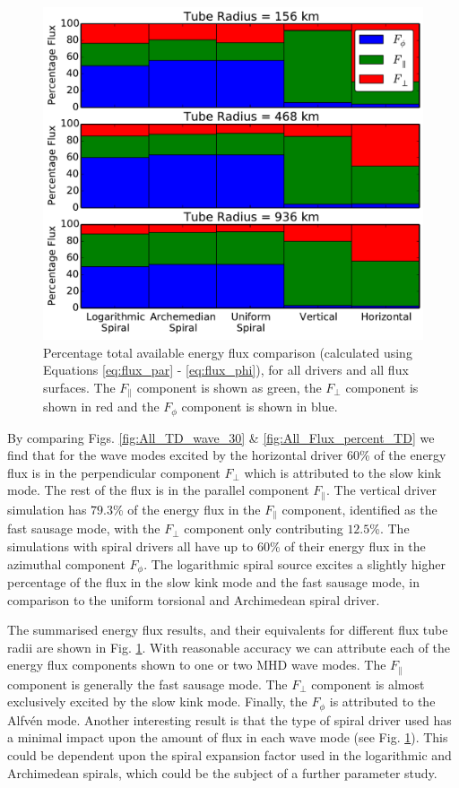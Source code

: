 \begin{figure}
    \centering
    \includegraphics[width=0.7\columnwidth]{Chapter4/Figs/p240_A10_Wave_Flux_comparision.pdf}
    \caption{Percentage total available energy flux comparison (calculated using Equations \ref{eq:flux_par} - \ref{eq:flux_phi}), for all drivers and all flux surfaces. The $F_\parallel$ component is shown as green, the $F_\perp$ component is shown in red and the $F_\phi$ component is shown in blue.}
    \label{fig:flux_bar_graph}
\end{figure}

By comparing Figs. \ref{fig:All_TD_wave_30} \& \ref{fig:All_Flux_percent_TD} we find that for the wave modes excited by the horizontal driver $60$\% of the energy flux is in the perpendicular component $F_\perp$ which is attributed to the slow kink mode.
The rest of the flux is in the parallel component $F_\parallel$. 
The vertical driver simulation has $79.3$\% of the energy flux in the $F_\parallel$ component, identified as the fast sausage mode, with the $F_\perp$ component only contributing $12.5$\%. 
The simulations with spiral drivers all have up to $60$\% of their energy flux in the azimuthal component $F_\phi$. 
The logarithmic spiral source excites a slightly higher percentage of the flux in the slow kink mode and the fast sausage mode, in comparison to the uniform torsional and Archimedean spiral driver.

The summarised energy flux results, and their equivalents for different flux tube radii are shown in Fig. \ref{fig:flux_bar_graph}.
With reasonable accuracy we can attribute each of the energy flux components shown to one or two MHD wave modes.
The $F_\parallel$ component is generally the fast sausage mode. 
The $F_\perp$ component is almost exclusively excited by the slow kink mode.
Finally, the $F_\phi$ is attributed to the Alfv\'en mode.
Another interesting result is that the type of spiral driver used has a minimal impact upon the amount of flux in each wave mode (see Fig. \ref{fig:flux_bar_graph}).
This could be dependent upon the spiral expansion factor used in the logarithmic and Archimedean spirals, which could be the subject of a further parameter study.

